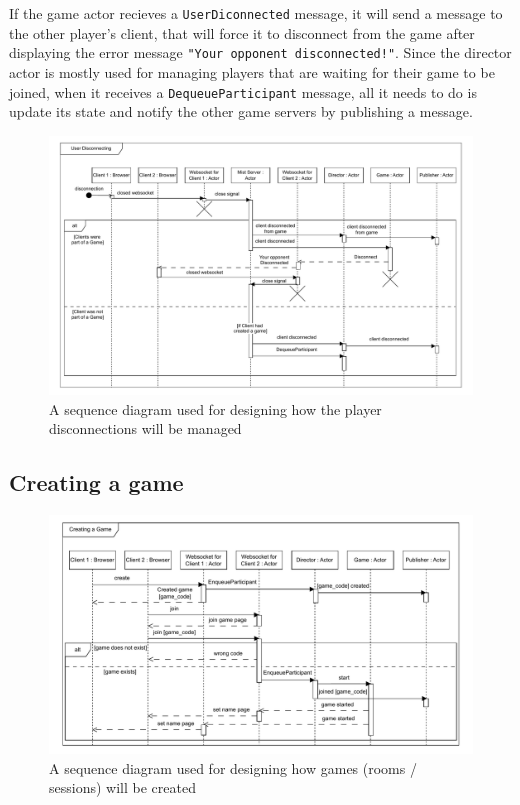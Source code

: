 \documentclass[]{final}
\begin{document}
\newpage

If the game actor recieves a \lstinline|UserDiconnected|
message, it will send a message to the other player's client, that will force it to disconnect
from the game after displaying the error message \lstinline|"Your opponent disconnected!"|.
Since the director actor is mostly used for managing players that are waiting for
their game to be joined, when it receives a \lstinline|DequeueParticipant| message, all it needs
to do is update its state and notify the other game servers by publishing a message.

\begin{figure}[ht!]
  \centering
  \includegraphics[width=\linewidth]{sequence_disconnecting}
  \caption{A sequence diagram used for designing how the player disconnections will be managed}
  \label{fig: 3}
\end{figure}

\newpage
{}
\subsection{Creating a game}

\begin{figure}[ht!]
  \centering
  \includegraphics[width=\linewidth]{sequence_creating}
  \caption{A sequence diagram used for designing how games (rooms / sessions) will be created}
  \label{fig: 3}
\end{figure}
\end{document}
